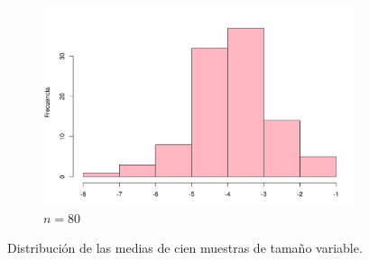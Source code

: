 \documentclass[12pt]{article}
\begin{document}
\begin{figure}
		\begin{subfigure}{\textwidth}
			\centering
			\includegraphics[scale=0.5]{meangap_80.png}
			\caption{$n=80$}
			\label{muestra_80}
		\end{subfigure}
	\caption{Distribución de las medias de cien muestras de tamaño variable.}
	\label{gaps}
	\end{figure}
	


\end{document}
